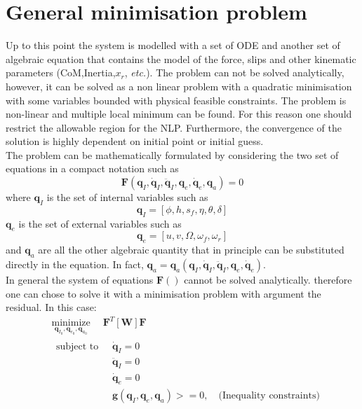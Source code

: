 \section{General minimisation problem}
%
Up to this point the system is modelled with a set of ODE and another set of algebraic equation that contains the model of the force, slips and other kinematic parameters (CoM,Inertia,$x_r$, \textit{etc.}). The problem can not be solved analytically, however, it can be solved as a non linear problem with a quadratic minimisation with some variables bounded with physical feasible constraints. The problem is non-linear and multiple local minimum can be found. For this reason one should restrict the allowable region for the NLP. Furthermore, the convergence of the solution is highly dependent on initial point or initial guess.\\
The problem can be mathematically formulated by considering the two set of equations in a compact notation such as
%
\begin{equation}
    \mathbf{F}(\mathbf{q}_I,\dot{\mathbf{q}}_I,\ddot{\mathbf{q}}_I,\mathbf{q}_e,\dot{\mathbf{q}}_e,\mathbf{q}_a)=0
\end{equation}
%
where $\mathbf{q}_I$ is the set of internal variables such as 
%
\begin{equation}
    \mathbf{q}_I = [\phi,h,s_f,\eta,\theta,\delta ] 
\end{equation}
%
$\mathbf{q}_e$ is the set of external variables such as 
%
\begin{equation}
    \mathbf{q}_e = [u,v,\Omega,\omega_f,\omega_r ] 
\end{equation}
%
and $\mathbf{q}_a$ are all the other algebraic quantity that in principle can be substituted directly in the equation. In fact, $\mathbf{q}_a=\mathbf{q}_a(\mathbf{q}_I,\dot{\mathbf{q}}_I,\ddot{\mathbf{q}}_I,\mathbf{q}_e,\dot{\mathbf{q}}_e)$.\\
%
In general the system of equations $\mathbf{F}()$ cannot be solved analytically. therefore one can chose to solve it with a minimisation problem with argument the residual. In this case:
%
\begin{equation}
    \begin{aligned}
    &\underset{\mathbf{q}_{I_0}, \mathbf{q}_{e_0}, \mathbf{q}_{a_0}}{\operatorname{minimize}} \quad \mathbf{F}^T [\mathbf{W}]  \mathbf{F} \\
    &\begin{aligned}
        {\text { subject to }} \;
        & \dot{\mathbf{q}}_I=0\\
        & \ddot{\mathbf{q}}_I=0\\
        & \dot{\mathbf{q}}_e=0\\
        & \mathbf{g}(\mathbf{q}_I, \mathbf{q}_e, \mathbf{q}_a)>=0, \quad \text{(Inequality constraints)}
    \end{aligned}\\
    \end{aligned}
\end{equation}

